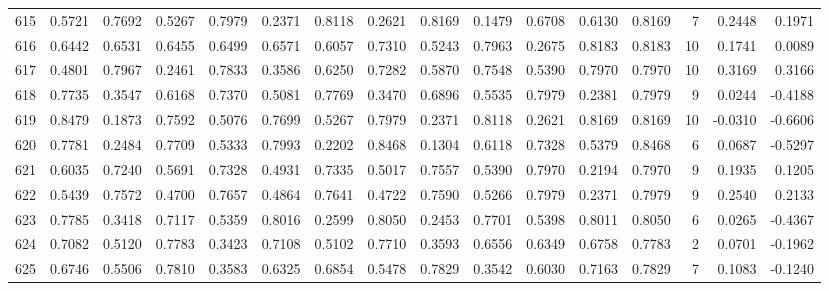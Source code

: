 \begin{tabular}{lrrrrrrrrrrrrrrr}
615 &      0.5721 &  0.7692 &  0.5267 &  0.7979 &  0.2371 &  0.8118 &  0.2621 &  0.8169 &  0.1479 &  0.6708 &   0.6130 &     0.8169 &      7 &                    0.2448 &                     0.1971 \\
616 &      0.6442 &  0.6531 &  0.6455 &  0.6499 &  0.6571 &  0.6057 &  0.7310 &  0.5243 &  0.7963 &  0.2675 &   0.8183 &     0.8183 &     10 &                    0.1741 &                     0.0089 \\
617 &      0.4801 &  0.7967 &  0.2461 &  0.7833 &  0.3586 &  0.6250 &  0.7282 &  0.5870 &  0.7548 &  0.5390 &   0.7970 &     0.7970 &     10 &                    0.3169 &                     0.3166 \\
618 &      0.7735 &  0.3547 &  0.6168 &  0.7370 &  0.5081 &  0.7769 &  0.3470 &  0.6896 &  0.5535 &  0.7979 &   0.2381 &     0.7979 &      9 &                    0.0244 &                    -0.4188 \\
619 &      0.8479 &  0.1873 &  0.7592 &  0.5076 &  0.7699 &  0.5267 &  0.7979 &  0.2371 &  0.8118 &  0.2621 &   0.8169 &     0.8169 &     10 &                   -0.0310 &                    -0.6606 \\
620 &      0.7781 &  0.2484 &  0.7709 &  0.5333 &  0.7993 &  0.2202 &  0.8468 &  0.1304 &  0.6118 &  0.7328 &   0.5379 &     0.8468 &      6 &                    0.0687 &                    -0.5297 \\
621 &      0.6035 &  0.7240 &  0.5691 &  0.7328 &  0.4931 &  0.7335 &  0.5017 &  0.7557 &  0.5390 &  0.7970 &   0.2194 &     0.7970 &      9 &                    0.1935 &                     0.1205 \\
622 &      0.5439 &  0.7572 &  0.4700 &  0.7657 &  0.4864 &  0.7641 &  0.4722 &  0.7590 &  0.5266 &  0.7979 &   0.2371 &     0.7979 &      9 &                    0.2540 &                     0.2133 \\
623 &      0.7785 &  0.3418 &  0.7117 &  0.5359 &  0.8016 &  0.2599 &  0.8050 &  0.2453 &  0.7701 &  0.5398 &   0.8011 &     0.8050 &      6 &                    0.0265 &                    -0.4367 \\
624 &      0.7082 &  0.5120 &  0.7783 &  0.3423 &  0.7108 &  0.5102 &  0.7710 &  0.3593 &  0.6556 &  0.6349 &   0.6758 &     0.7783 &      2 &                    0.0701 &                    -0.1962 \\
625 &      0.6746 &  0.5506 &  0.7810 &  0.3583 &  0.6325 &  0.6854 &  0.5478 &  0.7829 &  0.3542 &  0.6030 &   0.7163 &     0.7829 &      7 &                    0.1083 &                    -0.1240 \\

\end{tabular}
